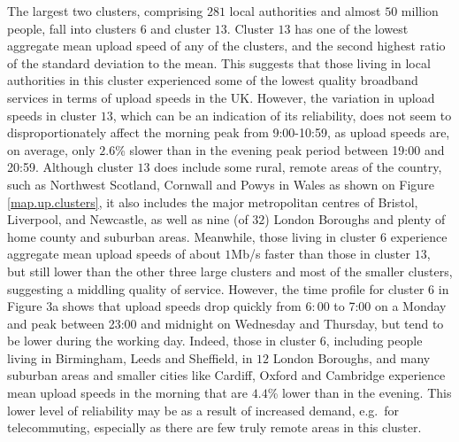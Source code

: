 \documentclass[]{interact}
\theoremstyle{plain}%
\theoremstyle{definition}
\theoremstyle{remark}
\begin{document}
The largest two clusters, comprising \(281\) local authorities and
almost \(50\) million people, fall into clusters \(6\) and cluster
\(13\). Cluster \(13\) has one of the lowest aggregate mean upload speed
of any of the clusters, and the second highest ratio of the standard
deviation to the mean. This suggests that those living in local
authorities in this cluster experienced some of the lowest quality
broadband services in terms of upload speeds in the UK. However, the
variation in upload speeds in cluster \(13\), which can be an indication
of its reliability, does not seem to disproportionately affect the
morning peak from 9:00-10:59, as upload speeds are, on average, only
\(2.6\)\% slower than in the evening peak period between 19:00 and
20:59. Although cluster \(13\) does include some rural, remote areas of
the country, such as Northwest Scotland, Cornwall and Powys in Wales as
shown on Figure \ref{map.up.clusters}, it also includes the major
metropolitan centres of Bristol, Liverpool, and Newcastle, as well as
nine (of \(32\)) London Boroughs and plenty of home county and suburban
areas. Meanwhile, those living in cluster \(6\) experience aggregate
mean upload speeds of about \(1\)Mb/s faster than those in cluster
\(13\), but still lower than the other three large clusters and most of
the smaller clusters, suggesting a middling quality of service. However,
the time profile for cluster \(6\) in Figure \(3\)a shows that upload
speeds drop quickly from \(6:00\) to 7:00 on a Monday and peak between
23:00 and midnight on Wednesday and Thursday, but tend to be lower
during the working day. Indeed, those in cluster \(6\), including people
living in Birmingham, Leeds and Sheffield, in \(12\) London Boroughs,
and many suburban areas and smaller cities like Cardiff, Oxford and
Cambridge experience mean upload speeds in the morning that are
\(4.4\)\% lower than in the evening. This lower level of reliability may
be as a result of increased demand, e.g.~for telecommuting, especially
as there are few truly remote areas in this cluster.
\end{document}
